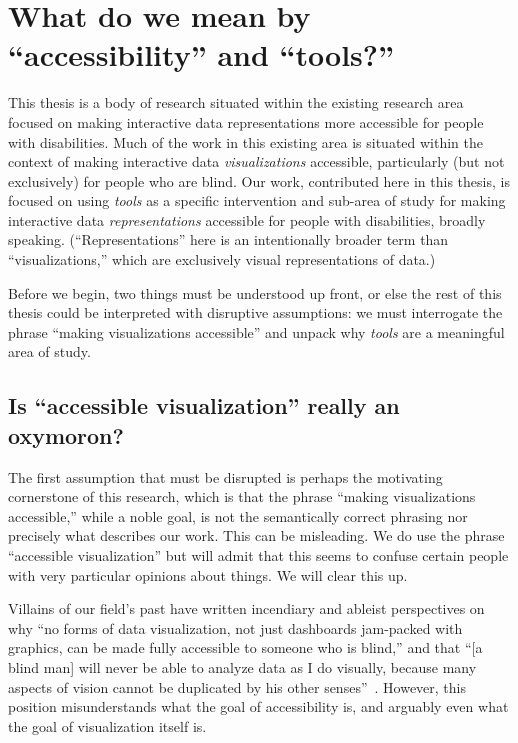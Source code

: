 \documentclass[12pt]{cmuthesis}
\begin{document}
\section{What do we mean by ``accessibility'' and ``tools?''}

This thesis is a body of research situated within the existing research area focused on making interactive data representations more accessible for people with disabilities. Much of the work in this existing area is situated within the context of making interactive data \textit{visualizations} accessible, particularly (but not exclusively) for people who are blind. Our work, contributed here in this thesis, is focused on using \textit{tools} as a specific intervention and sub-area of study for making interactive data \textit{representations} accessible for people with disabilities, broadly speaking. (``Representations'' here is an intentionally broader term than ``visualizations,'' which are exclusively visual representations of data.)

Before we begin, two things must be understood up front, or else the rest of this thesis could be interpreted with disruptive assumptions: we must interrogate the phrase ``making visualizations accessible'' and unpack why \textit{tools} are a meaningful area of study.

\subsection{Is ``accessible visualization'' really an oxymoron?}
The first assumption that must be disrupted is perhaps the motivating cornerstone of this research, which is that the phrase ``making visualizations accessible,'' while a noble goal, is not the semantically correct phrasing nor precisely what describes our work. This can be misleading. We do use the phrase ``accessible visualization'' but will admit that this seems to confuse certain people with very particular opinions about things. We will clear this up.

Villains of our field's past have written incendiary and ableist perspectives on why ``no forms of data visualization, not just dashboards jam-packed with graphics, can be made fully accessible to someone who is blind,'' and that ``[a blind man] will never be able to analyze data as I do visually, because many aspects of vision cannot be duplicated by his other senses''~\cite{Few}. However, this position misunderstands what the goal of accessibility is, and arguably even what the goal of visualization itself is.
\end{document}
